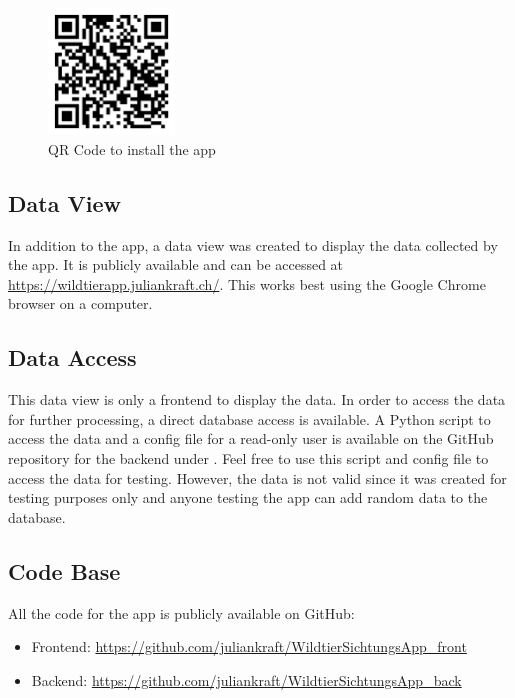 \documentclass{josis}
\begin{document}
\begin{figure}[tbh]
    \centering
    \includegraphics[width=0.3\textwidth]{images/qr_code_app.png}
    \caption{QR Code to install the app}\label{fig:qr_code_app}
\end{figure}

\subsection{Data View}

In addition to the app, a data view was created to display the data collected by the app. It is publicly available and can be 
accessed at \url{https://wildtierapp.juliankraft.ch/}. This works best using the Google Chrome browser on a computer.

\subsection{Data Access}

This data view is only a frontend to display the data. In order to access the data for further processing, a direct database access is available.
A Python script to access the data and a config file for a read-only user is available on the GitHub repository 
for the backend under .
Feel free to use this script and config file to access the data for testing. However, the data is not valid since it was created for testing purposes only
and anyone testing the app can add random data to the database.

\subsection{Code Base}
All the code for the app is publicly available on GitHub:
\begin{itemize}
    \item Frontend: \url{https://github.com/juliankraft/WildtierSichtungsApp_front}
    \item Backend: \url{https://github.com/juliankraft/WildtierSichtungsApp_back}
\end{itemize}
\end{document}
